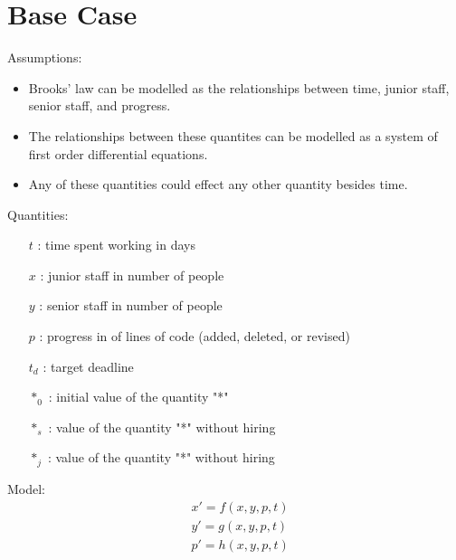 \documentclass{article}
\newenvironment{atomize}
    {\begin{list} {} {
            \setlength\itemindent{0pt}
            \setlength\leftmargin{10pt}
            \setlength\labelwidth{0pt}
    }}
    {\end{list}}
\begin{document}
\section*{Base Case}
  \begin{atomize}
    \item Assumptions:
      \begin{itemize}
        \item Brooks' law can be modelled as the relationships between
        time, junior staff, senior staff, and progress.
        \item The relationships between these quantites can be modelled
        as a system of first order differential equations.
        \item Any of these quantities could effect any other quantity besides
        time.  
        \end{itemize}

    \item Quantities:
      \begin{itemize}
        \item [$t$]: time spent working in days
        \item [$x$]: junior staff in number of people
        \item [$y$]: senior staff in number of people
        \item [$p$]: progress in of lines of code (added, deleted, or revised)
        \item [$t_{d}$]: target deadline
        \item [$*_{0}$]: initial value of the quantity "*"
        \item [$*_{s}$]: value of the quantity "*" without hiring
        \item [$*_{j}$]: value of the quantity "*" without hiring
      \end{itemize}
  
    \item Model:
      \begin{align*}
        &x\prime = f\left(x, y, p, t\right) \\[6pt]
        &y\prime = g\left(x, y, p, t\right) \\[6pt]
        &p\prime = h\left(x, y, p, t\right)
      \end{align*}
  \end{atomize}
\end{document}

